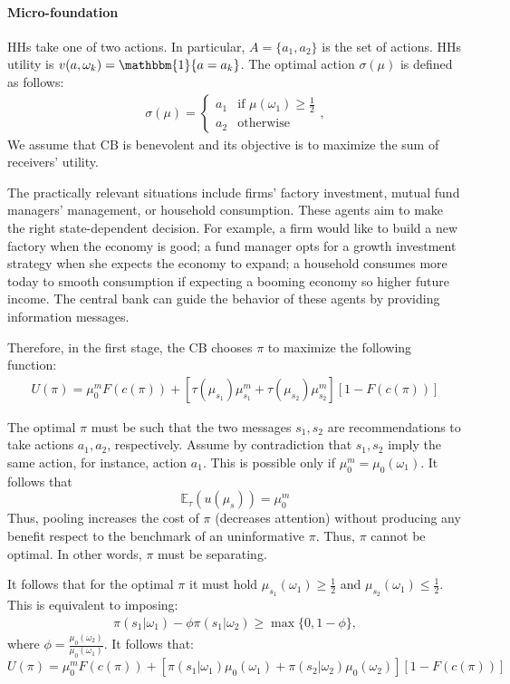 \documentclass[12pt,a4paper]{article}
\begin{document}
\paragraph{Micro-foundation}
HHs take one of two actions. In particular, $A=\{a_1,a_2\}$ is the set of actions. HHs utility is $v(a,\omega_k)=\mathbbm{1}\{a=a_{k}\}$. The optimal action $\sigma(\mu)$ is defined as follows: 
\begin{align}
\sigma(\mu)=\left\{\begin{array}{ll}
a_1   &  \mbox{if } \mu(\omega_1)\geq \frac{1}{2}\\
a_2   &  \mbox{otherwise}
\end{array}\right.,
\end{align}
We assume that CB is benevolent and its objective is to maximize the sum of receivers' utility.


The practically relevant situations include firms' factory investment, mutual fund managers' management, or household consumption. These agents aim to make the right state-dependent decision. For example, a firm would like to build a new factory when the economy is good; a fund manager opts for a growth investment strategy when she expects the economy to expand; a household consumes more today to smooth consumption if expecting a booming economy so higher future income. The central bank can guide the behavior of these agents by providing information messages.

Therefore, in the first stage, the CB chooses $\pi$ to maximize the following function:
\begin{align}
    U(\pi)=\mu_0^mF(c(\pi)) + \left[\tau(\mu_{s_1})\mu^m_{s_1} + \tau(\mu_{s_2})\mu^m_{s_2}\right][1-F(c(\pi))]
\end{align}

The optimal $\pi$ must be such that the two messages $s_1,s_2$ are recommendations to take actions $a_1,a_2$, respectively. Assume by contradiction that $s_1,s_2$ imply the same action, for instance, action $a_1$. This is possible only if $\mu_0^m=\mu_0(\omega_1)$. It follows that
$$\mathbb{E}_\tau(u(\mu_s)) =\mu_0^m$$
Thus, pooling increases the cost of $\pi$ (decreases attention) without producing any benefit respect to the benchmark of an uninformative $\pi$. Thus, $\pi$ cannot be optimal. In other words, $\pi$ must be separating. 

It follows that for the optimal $\pi$ it must hold $\mu_{s_1}(\omega_1)\geq\frac{1}{2}$ and $\mu_{s_2}(\omega_1)\leq\frac{1}{2}$. This is equivalent to imposing:
\begin{align}
    \pi(s_1|\omega_1)-\phi\pi(s_1|\omega_2)\geq \max\{0,1-\phi\},
\end{align}
where $\phi=\frac{\mu_0(\omega_2)}{\mu_0(\omega_1)}$. It follows that:
\begin{equation}
U(\pi)=\mu_0^mF(c(\pi)) + \left[\pi(s_1|\omega_1)\mu_{0}(\omega_1) + \pi(s_2|\omega_2)\mu_{0}(\omega_2)\right][1-F(c(\pi))]
\end{equation}
\end{document}
